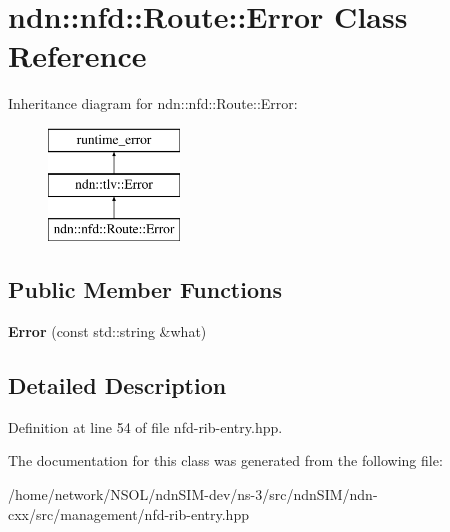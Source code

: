 \hypertarget{classndn_1_1nfd_1_1Route_1_1Error}{}\section{ndn\+:\+:nfd\+:\+:Route\+:\+:Error Class Reference}
\label{classndn_1_1nfd_1_1Route_1_1Error}
Inheritance diagram for ndn\+:\+:nfd\+:\+:Route\+:\+:Error\+:\begin{figure}[H]
\begin{center}
\leavevmode
\includegraphics[height=3.000000cm]{classndn_1_1nfd_1_1Route_1_1Error}
\end{center}
\end{figure}
\subsection*{Public Member Functions}
\begin{DoxyCompactItemize}
\item 
{\bfseries Error} (const std\+::string \&what)\hypertarget{classndn_1_1nfd_1_1Route_1_1Error_aa0e2bc14d07c3b30b0147d246d4876eb}{}\label{classndn_1_1nfd_1_1Route_1_1Error_aa0e2bc14d07c3b30b0147d246d4876eb}

\end{DoxyCompactItemize}


\subsection{Detailed Description}


Definition at line 54 of file nfd-\/rib-\/entry.\+hpp.



The documentation for this class was generated from the following file\+:\begin{DoxyCompactItemize}
\item 
/home/network/\+N\+S\+O\+L/ndn\+S\+I\+M-\/dev/ns-\/3/src/ndn\+S\+I\+M/ndn-\/cxx/src/management/nfd-\/rib-\/entry.\+hpp\end{DoxyCompactItemize}
